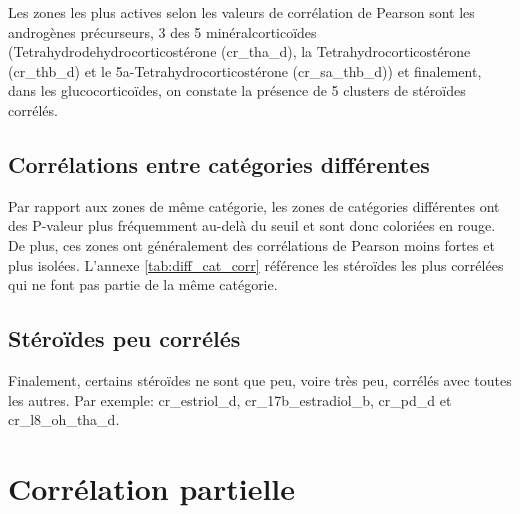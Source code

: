     Les zones les plus actives selon les valeurs de corrélation de Pearson sont les androgènes précurseurs, 3 des 5 minéralcorticoïdes (Tetrahydrodehydrocorticostérone (cr\_tha\_d), la Tetrahydrocorticostérone (cr\_thb\_d) et le 5a-Tetrahydrocorticostérone (cr\_sa\_thb\_d)) et finalement, dans les glucocorticoïdes, on constate la présence de 5 clusters de stéroïdes corrélés. 


\subsection{Corrélations entre catégories différentes}
    Par rapport aux zones de même catégorie, les zones de catégories différentes ont des P-valeur plus fréquemment au-delà du seuil et sont donc coloriées en rouge. De plus, ces zones ont généralement des corrélations de Pearson moins fortes et plus isolées. L'annexe \autoref{tab:diff_cat_corr} référence les stéroïdes les plus corrélées qui ne font pas partie de la même catégorie.


\subsection{Stéroïdes peu corrélés}
    Finalement, certains stéroïdes ne sont que peu, voire très peu, corrélés avec toutes les autres. Par exemple: cr\_estriol\_d, cr\_17b\_estradiol\_b, cr\_pd\_d et cr\_l8\_oh\_tha\_d. 

\section{Corrélation partielle}


